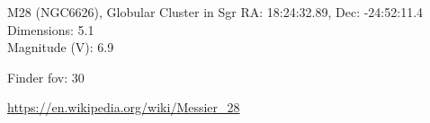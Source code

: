 \begin{block}{M28 (NGC6626), Globular Cluster in Sgr}
    RA: 18:24:32.89, Dec: -24:52:11.4 \\ 
    Dimensions: 5.1 \\ 
    Magnitude (V): 6.9



    Finder fov: 30 

    \url{https://en.wikipedia.org/wiki/Messier_28} 
\end{block}